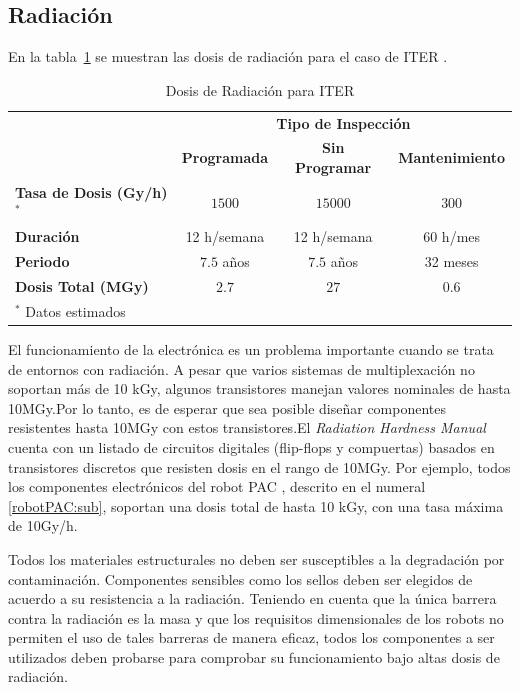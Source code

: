 \subsection*{Radiación}
En la tabla~\ref{tab:radiation} se muestran las dosis de radiación para el caso de ITER \cite{ITEROrg.2004}.
\begin{table} [htbp]
\centering
	\caption{Dosis de Radiación para ITER}
	\label{tab:radiation}
	\begin{tabular}{c c c c}
		\hline
		 & \multicolumn{3}{c}{\textbf{Tipo de Inspección}} \\ 
		 																& \textbf{Programada} 	& \textbf{Sin Programar} 		& \textbf{Mantenimiento }\\ 
		\hline
		\multicolumn{1}{l}{\textbf{Tasa de Dosis (Gy/h)$^*$}} 		& $1500$ 							& $15000$ 								& $300$ \\ 
		\multicolumn{1}{l}{\textbf{Duración}} 								& 12 h/semana 					& 12 h/semana 							& 60 h/mes \\ 
		\multicolumn{1}{l}{\textbf{Periodo}}									& $7.5$ años 						& $7.5$ años 								& 32 meses \\ 
		\multicolumn{1}{l}{\textbf{Dosis Total (MGy)}} 	& $2.7$ 								& $27$ 										& $0.6$ \\ 
		\hline
		\multicolumn{4}{l}{$^*$ \small{Datos estimados}}\\
	\end{tabular} 	
\end{table}
El funcionamiento de la electrónica es un problema importante cuando se trata de entornos con radiación\cite{Perrot2004}.
A pesar que varios sistemas de multiplexación no soportan más de 10 kGy, algunos transistores manejan valores nominales de hasta 10MGy.Por lo tanto, es de esperar que sea posible diseñar componentes resistentes hasta 10MGy con estos transistores.El \textit{Radiation Hardness Manual} \cite{Campbell2007} cuenta con un listado de circuitos digitales (flip-flops y compuertas) basados en transistores discretos que resisten dosis en el rango de 10MGy. Por ejemplo, todos los componentes electrónicos del robot PAC \cite{Perrot2004}, descrito en el numeral \ref{robotPAC:sub}, soportan una dosis total de hasta 10 kGy, con una tasa máxima de 10Gy/h.

Todos los materiales estructurales no deben ser susceptibles a la degradación por contaminación.
Componentes sensibles como los sellos deben ser elegidos de acuerdo a su resistencia a la radiación.
Teniendo en cuenta que la única barrera contra la radiación es la masa y que los requisitos dimensionales de los robots no permiten el uso de tales barreras de manera eficaz, todos los componentes a ser utilizados deben probarse para comprobar su funcionamiento bajo altas dosis de radiación.

